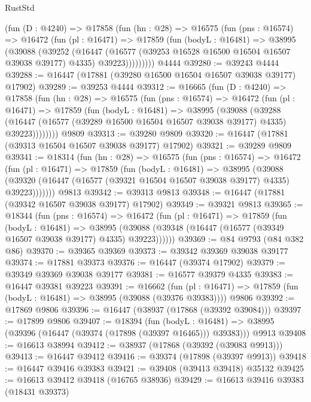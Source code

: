 \begin{lexlean}{RustStd}
\begin{coremodule}
      (fun (D : @4240) =>
      @17858
        (fun (hn : @28) =>
        @16575
          (fun (pns : @16574) =>
          @16472
            (fun (pl : @16471) =>
            @17859
              (fun (bodyL : @16481) =>
              @38995
                (@39088
                  (@39252
                    (@16447
                      (@16577 (@39253 @16528 @16500 @16504 @16507 @39038 @39177) @4335)
                      @39223)))))))))
    @4444
@39280 := @39243 @4444
@39288 := @16447 (@17881 (@39280 @16500 @16504 @16507 @39038 @39177) @17902)
@39289 := @39253 @4444
@39312 := @16665
    (fun (D : @4240) =>
    @17858
      (fun (hn : @28) =>
      @16575
        (fun (pns : @16574) =>
        @16472
          (fun (pl : @16471) =>
          @17859
            (fun (bodyL : @16481) =>
            @38995
              (@39088
                (@39288
                  (@16447 (@16577 (@39289 @16500 @16504 @16507 @39038 @39177) @4335) @39223))))))))
    @9809
@39313 := @39280 @9809
@39320 := @16447 (@17881 (@39313 @16504 @16507 @39038 @39177) @17902)
@39321 := @39289 @9809
@39341 := @18314
    (fun (hn : @28) =>
    @16575
      (fun (pns : @16574) =>
      @16472
        (fun (pl : @16471) =>
        @17859
          (fun (bodyL : @16481) =>
          @38995
            (@39088
              (@39320 (@16447 (@16577 (@39321 @16504 @16507 @39038 @39177) @4335) @39223)))))))
    @9813
@39342 := @39313 @9813
@39348 := @16447 (@17881 (@39342 @16507 @39038 @39177) @17902)
@39349 := @39321 @9813
@39365 := @18344
    (fun (pns : @16574) =>
    @16472
      (fun (pl : @16471) =>
      @17859
        (fun (bodyL : @16481) =>
        @38995 (@39088 (@39348 (@16447 (@16577 (@39349 @16507 @39038 @39177) @4335) @39223))))))
@39369 := @84 @9793 (@84 @382 @86)
@39370 := @39365 @39369
@39373 := @39342 @39369 @39038 @39177
@39374 := @17881 @39373
@39376 := @16447 (@39374 @17902)
@39379 := @39349 @39369 @39038 @39177
@39381 := @16577 @39379 @4335
@39383 := @16447 @39381 @39223
@39391 := @16662
    (fun (pl : @16471) => @17859 (fun (bodyL : @16481) => @38995 (@39088 (@39376 @39383))))
    @9806
@39392 := @17869 @9806
@39396 := @16447 (@38937 (@17868 (@39392 @39084)))
@39397 := @17899 @9806
@39407 := @18394
    (fun (bodyL : @16481) => @38995 (@39396 (@16447 (@39374 (@17898 (@39397 @16465))) @39383)))
    @9913
@39408 := @16613 @38994
@39412 := @38937 (@17868 (@39392 (@39083 @9913)))
@39413 := @16447 @39412
@39416 := @39374 (@17898 (@39397 @9913))
@39418 := @16447 @39416 @39383
@39421 := @39408 (@39413 @39418) @35132
@39425 := @16613 @39412 @39418 (@16765 @38936)
@39429 := @16613 @39416 @39383 (@18431 @39373)

\end{coremodule}
\end{lexlean}
